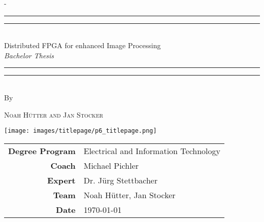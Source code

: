 \begin{titlingpage}
\begin{SingleSpace}
\calccentering{\unitlength} 
\begin{adjustwidth*}{\unitlength}{-\unitlength}
\vspace*{0mm}
\begin{center}
\rule[0.5ex]{\linewidth}{2pt}\vspace*{-\baselineskip}\vspace*{3.2pt}
\rule[0.5ex]{\linewidth}{1pt}\\[\baselineskip]

{\HUGE Distributed FPGA for enhanced Image Processing }\\[4mm]
{\Large \textit{Bachelor Thesis}}\\

\rule[0.5ex]{\linewidth}{1pt}\vspace*{-\baselineskip}\vspace{3.2pt}
\rule[0.5ex]{\linewidth}{2pt}\\
\vspace{2mm}
{\large By}\\
\vspace{2mm}

{\large\textsc{Noah H\"utter and Jan Stocker}}\\

\vspace{11mm}

\texttt{[image: images/titlepage/p6\_titlepage.png]}\\

\vspace{2mm}

\begin{tabular}{>{\bfseries}rl}
        \large Degree Program   & Electrical and Information Technology \\[2mm]
        \large Coach            & Michael Pichler \\[2mm]
        \large Expert           & Dr. J\"urg Stettbacher\\[2mm]
        \large Team             & Noah H\"utter, Jan Stocker \\[2mm]
        \large Date             & \today \\[2mm]
\end{tabular}


\end{center}
\end{adjustwidth*}
\end{SingleSpace}
\end{titlingpage}
